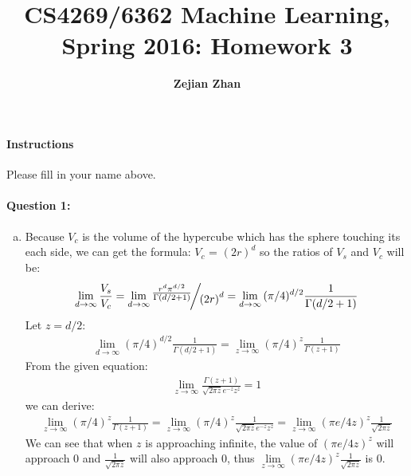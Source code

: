 \documentclass[letterpaper,11pt]{article}
\title{CS4269/6362 Machine Learning, Spring 2016: Homework 3}
\date{}
\author{\bf Zejian Zhan}
\begin{document}
\maketitle

\paragraph*{Instructions} Please fill in your name above.

\paragraph{Question 1:}
\begin{enumerate}[(a)]
\item \begin{enumerate}[(1)]
Because $V_c$ is the volume of the hypercube which has the sphere touching its each side, we can get the formula: $V_c$ = $(2r)^d$
so the ratios of $V_s$ and $V_c$ will be:
\begin{eqnarray}
\mathop {\lim }\limits_{d \to \infty } \frac{{{V_s}}}{{{V_c}}} = \mathop {\lim }\limits_{d \to \infty } {\raise0.7ex\hbox{${\frac{{{r^d}{\pi ^{d/2}}}}{{\Gamma (d/2 + 1)}}}$} \!\mathord{\left/
 {\vphantom {{\frac{{{r^d}{\pi ^{d/2}}}}{{\Gamma (d/2 + 1)}}} {{{(2r)}^d}}}}\right.\kern-\nulldelimiterspace}
\!\lower0.7ex\hbox{${{{(2r)}^d}}$}} = \mathop {\lim }\limits_{d \to \infty } {(\pi /4)^{d/2}}\frac{1}{{\Gamma (d/2 + 1)}}
\end{eqnarray}
Let $z=d/2$:
\begin{eqnarray}
\mathop {\lim }\limits_{d \to \infty } {(\pi /4)^{d/2}}\frac{1}{{\Gamma (d/2 + 1)}} = \mathop {\lim }\limits_{z \to \infty } {(\pi /4)^z}\frac{1}{{\Gamma (z + 1)}}
\end{eqnarray}
From the given equation:
\begin{eqnarray}
\lim_{z\rightarrow\infty}\frac{\Gamma(z+1)}{\sqrt{2\pi z}e^{-z}z^z}=1
\end{eqnarray}
we can derive:
\begin{eqnarray}
\mathop {\lim }\limits_{z \to \infty } {(\pi /4)^z}\frac{1}{{\Gamma (z + 1)}} = \mathop {\lim }\limits_{z \to \infty } {(\pi /4)^z}\frac{1}{{\sqrt {2\pi z} {e^{ - z}}{z^z}}} = \mathop {\lim }\limits_{z \to \infty } {(\pi e/4z)^z}\frac{1}{{\sqrt {2\pi z} }}
\end{eqnarray}
We can see that when $z$ is approaching infinite, the value of ${(\pi e/4z)^z}$ will approach 0 and $\frac{1}{{\sqrt {2\pi z} }}$ will also approach 0, thus $\mathop {\lim }\limits_{z \to \infty } {(\pi e/4z)^z}\frac{1}{{\sqrt {2\pi z} }}$ is 0. 


\end{enumerate}
\end{enumerate}
\end{document}
